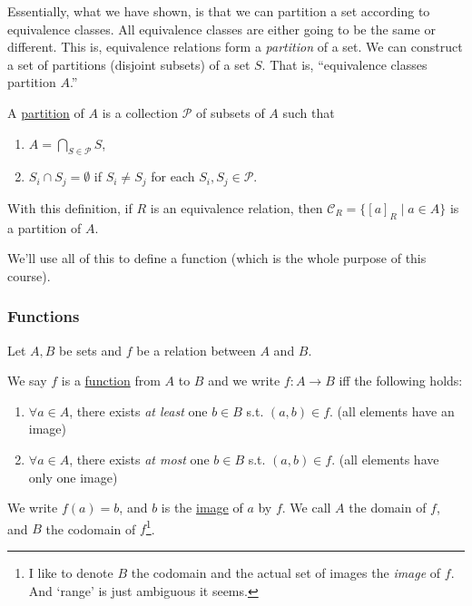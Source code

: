 Essentially, what we have shown, is that we can partition a set according to equivalence classes. All equivalence classes are either going to be the same or different. This is, equivalence relations form a \emph{partition} of a set. We can construct a set of partitions (disjoint subsets) of a set $S$. That is, ``equivalence classes partition $A$.''

\begin{definition}[Partition]
    A \ul{partition} of $A$ is a collection $\mathcal{P}$ of subsets of $A$ such that
    \begin{enumerate}
        \item $A = \bigcap_{S\in \mathcal{P}}S$,
        \item $S_i\cap S_j = \emptyset$ if $S_i\neq S_j$ for each $S_i, S_j\in \mathcal{P}$.
    \end{enumerate}
\end{definition}

With this definition, if $R$ is an equivalence relation, then $\mathcal{C}_R = \{[a]_R\mid a\in A\}$ is a partition of $A$.

We'll use all of this to define a function (which is the whole purpose of this course).

\subsubsection{Functions}
\begin{definition}[Function]
    Let $A, B$ be sets and $f$ be a relation between $A$ and $B$.

    We say $f$ is a \ul{function} from $A$ to $B$ and we write $f: A\to B$ iff the following holds:
    \begin{enumerate}
        \item $\forall a\in A$, there exists \emph{at least} one $b\in B$ s.t. $(a, b)\in f$. (all elements have an image)
        \item $\forall a\in A$, there exists \emph{at most} one $b\in B$ s.t. $(a, b)\in f$. (all elements have only one image)
    \end{enumerate}
    We write $f(a) = b$, and $b$ is the \ul{image} of $a$ by $f$. We call $A$ the domain of $f$, and $B$ the codomain of $f$\footnote{I like to denote $B$ the codomain and the actual set of images the \emph{image} of $f$. And `range' is just ambiguous it seems.}.
\end{definition}